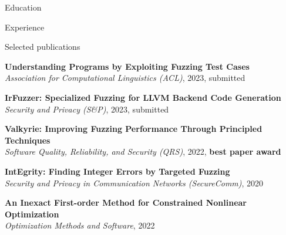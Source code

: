%
%
%
%
\def\lang{eng}





\begin{rSection}{Education}
	
	
\end{rSection}

\begin{rSection}{Experience}
	
	
	
\end{rSection}

\begin{rSection}{Selected publications}
	\begin{rSubsection}{}{}{}{}
		\item \textbf{Understanding Programs by Exploiting Fuzzing Test Cases} \\ \textit{Association for Computational Linguistics (ACL)}, 2023, submitted
		\item \textbf{IrFuzzer: Specialized Fuzzing for LLVM Backend Code Generation} \\ \textit{Security and Privacy (S\&P)}, 2023, submitted
		\item \textbf{Valkyrie: Improving Fuzzing Performance Through Principled Techniques} \\ \textit{Software Quality, Reliability, and Security (QRS)}, 2022, \textbf{best paper award}
		\item \textbf{IntEgrity: Finding Integer Errors by Targeted Fuzzing} \\ \textit{Security and Privacy in Communication Networks (SecureComm)}, 2020
		\item \textbf{An Inexact First-order Method for Constrained Nonlinear Optimization} \\ \textit{Optimization Methods and Software}, 2022
	\end{rSubsection}
\end{rSection}


